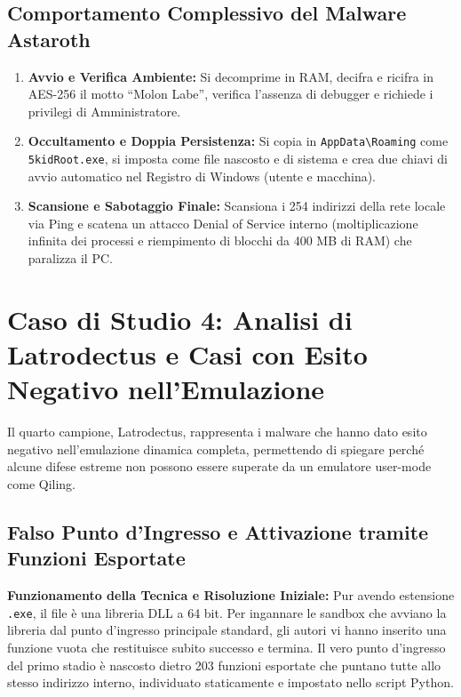\documentclass[11pt, a4paper]{article}
\begin{document}
	\subsection{Comportamento Complessivo del Malware Astaroth}
	
	\begin{enumerate}
		\item \textbf{Avvio e Verifica Ambiente:} Si decomprime in RAM, decifra e ricifra in AES-256 il motto ``Molon Labe'', verifica l'assenza di debugger e richiede i privilegi di Amministratore.
		\item \textbf{Occultamento e Doppia Persistenza:} Si copia in \texttt{AppData\textbackslash Roaming} come \texttt{5kidRoot.exe}, si imposta come file nascosto e di sistema e crea due chiavi di avvio automatico nel Registro di Windows (utente e macchina).
		\item \textbf{Scansione e Sabotaggio Finale:} Scansiona i 254 indirizzi della rete locale via Ping e scatena un attacco Denial of Service interno (moltiplicazione infinita dei processi e riempimento di blocchi da 400 MB di RAM) che paralizza il PC.
	\end{enumerate}
	
	\section{Caso di Studio 4: Analisi di Latrodectus e Casi con Esito Negativo nell'Emulazione}
	
	Il quarto campione, Latrodectus, rappresenta i malware che hanno dato esito negativo nell'emulazione dinamica completa, permettendo di spiegare perché alcune difese estreme non possono essere superate da un emulatore user-mode come Qiling.
	
	\subsection{Falso Punto d'Ingresso e Attivazione tramite Funzioni Esportate}
	
	\textbf{Funzionamento della Tecnica e Risoluzione Iniziale:} Pur avendo estensione \texttt{.exe}, il file è una libreria DLL a 64 bit. Per ingannare le sandbox che avviano la libreria dal punto d'ingresso principale standard, gli autori vi hanno inserito una funzione vuota che restituisce subito successo e termina. Il vero punto d'ingresso del primo stadio è nascosto dietro 203 funzioni esportate che puntano tutte allo stesso indirizzo interno, individuato staticamente e impostato nello script Python.
	
\end{document}
